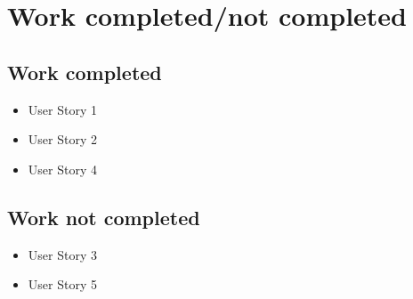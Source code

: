 \documentclass[10pt]{article}
\newcommand{\fancysecX}[2] {{\color{primary}\section*{#1} \label{sec:#2}}}
\newcommand{\fancysubX}[2] {{\color{primary}\subsection*{#1} \label{sec:#2}}}
\begin{document}
     


\fancysecX{Work completed/not completed}{completeWork}

	\fancysubX{Work completed}{completed}
		\begin{itemize}
            \item User Story 1
            \item User Story 2
            \item User Story 4
    	\end{itemize}

    \fancysubX{Work not completed}{notCompleted}
		\begin{itemize}
            \item User Story 3
            \item User Story 5
    	\end{itemize}
\end{document}
